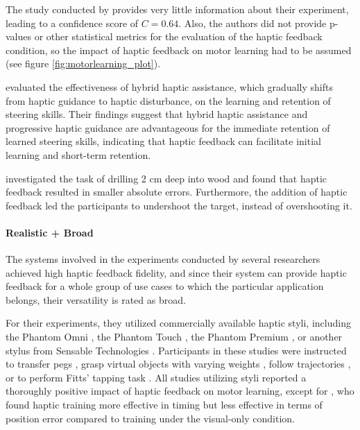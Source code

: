 The study conducted by \cite{Manivannan2008} provides very little information about their experiment, leading to a confidence score of $C = 0.64$. Also, the authors did not provide p-values or other statistical metrics for the evaluation of the haptic feedback condition, so the impact of haptic feedback on motor learning had to be assumed (see figure \ref{fig:motorlearning_plot}).

\cite{LeeH2014} evaluated the effectiveness of hybrid haptic assistance, which gradually shifts from haptic guidance to haptic disturbance, on the learning and retention of steering skills. Their findings suggest that hybrid haptic assistance and progressive haptic guidance are advantageous for the immediate retention of learned steering skills, indicating that haptic feedback can facilitate initial learning and short-term retention. 

\cite{Grant2019} investigated the task of drilling 2 cm deep into wood and found that haptic feedback resulted in smaller absolute errors. Furthermore, the addition of haptic feedback led the participants to undershoot the target, instead of overshooting it. 


\paragraph{Realistic + Broad} \label{sec:realisticbroad}
The systems involved in the experiments conducted by several researchers achieved high haptic feedback fidelity, and since their system can provide haptic feedback for a whole group of use cases to which the particular application belongs, their versatility is rated as broad.

For their experiments, they utilized commercially available haptic styli, including the Phantom Omni \cite{Brickler2019, Fehlberg2012}, the Phantom Touch \cite{Gunter2022}, the Phantom Premium \cite{Rodriguez2010, Wall2000}, or another stylus from Sensable Technologies \cite{Feygin2002HapticSkill}. Participants in these studies were instructed to transfer pegs \cite{Brickler2019}, grasp virtual objects with varying weights \cite{Gunter2022}, follow trajectories \cite{Fehlberg2012, Feygin2002HapticSkill, Rodriguez2010}, or to perform Fitts' tapping task \cite{Wall2000, Fitts1954TheMovement}. All studies utilizing styli reported a thoroughly positive impact of haptic feedback on motor learning, except for \cite{Feygin2002HapticSkill}, who found haptic training more effective in timing but less effective in terms of position error compared to training under the visual-only condition.

